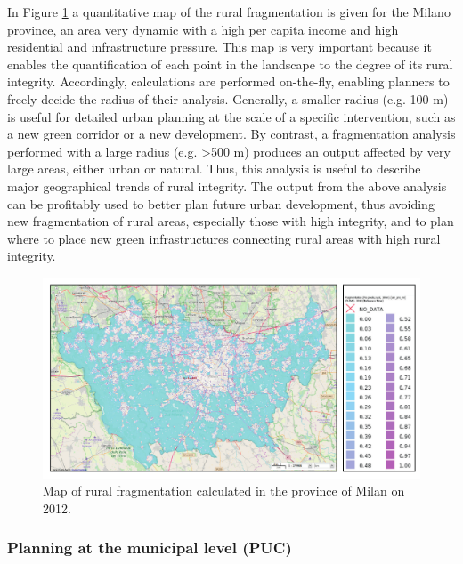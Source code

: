 \documentclass[APA,LATO1COL,doublespace]{WileyNJD-v2}
\begin{document}
In Figure \ref{fig:casePROV} a quantitative map of the rural fragmentation is given for the Milano province, an area very dynamic with a high per capita income and high residential and infrastructure pressure. 
This map is very important because it enables the quantification of each point in the landscape to the degree of its rural integrity. 
Accordingly, calculations are performed on-the-fly, enabling planners to freely decide the radius of their analysis.
Generally, a smaller radius (e.g. 100 m) is useful for detailed urban planning at the scale of a specific intervention, such as a new green corridor or a new development.
By contrast, a fragmentation analysis performed with a large radius (e.g. >500 m) produces an output affected by very large areas, either urban or natural. 
Thus, this analysis is useful to describe major geographical trends of rural integrity.
The output from the above analysis can be profitably used to better plan future urban development, thus avoiding new fragmentation of rural areas, especially those with high integrity, and to plan where to place new green infrastructures connecting rural areas with high rural integrity.

\begin{figure}[t] %
    \centerline{\includegraphics[width=450pt]{06_caso_provinciale.pdf}}
    \caption{ Map of rural fragmentation calculated in the province of Milan on 2012. } \label{fig:casePROV}
\end{figure}


\subsubsection{ Planning at the municipal level (PUC) }
\label{sec:caseCOM}
\end{document}
